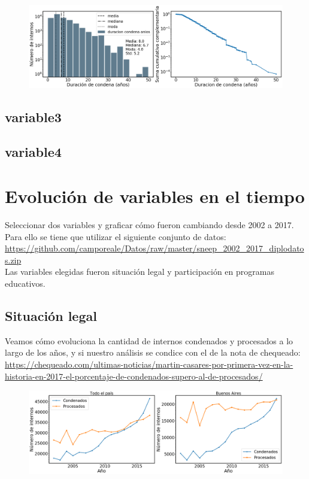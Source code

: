 \documentclass[10pt]{article}
\begin{document}
\begin{figure}[H]
	\centering
	\includegraphics[scale=0.3]{graficos/duracion.png}
	\caption{}
\end{figure}

\subsection{variable3}

\subsection{variable4}

\section{Evolución de variables en el tiempo}
Seleccionar dos variables y graficar cómo fueron cambiando desde 2002 a 2017. Para ello se tiene que utilizar el siguiente conjunto de datos: \url{https://github.com/camporeale/Datos/raw/master/sneep_2002_2017_diplodatos.zip}\\

Las variables elegidas fueron situación legal y participación en programas educativos.

\subsection{Situación legal}

Veamos cómo evoluciona la cantidad de internos condenados y procesados a lo largo de los años, y si nuestro análisis se condice con el de la nota de chequeado: \url{https://chequeado.com/ultimas-noticias/martin-casares-por-primera-vez-en-la-historia-en-2017-el-porcentaje-de-condenados-supero-al-de-procesados/}

\begin{figure}[H]
	\centering
	\includegraphics[scale=0.3]{graficos/situacion.png}
	\caption{}
\end{figure}
\end{document}
